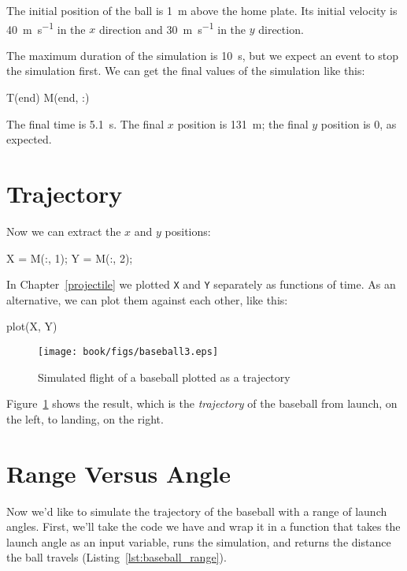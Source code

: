 The initial position of the ball is \SI{1}{\meter} above the home plate.  Its initial velocity is \SI{40}{\meter\per\second} in the $x$ direction and \SI{30}{\meter\per\second} in the $y$ direction.


The maximum duration of the simulation is \SI{10}{\second}, but we expect an event to stop the simulation first.  We can get the final values of the simulation like this:
    
\begin{code}
    T(end)
    M(end, :)
\end{code}

The final time is \SI{5.1}{\second}.  The final $x$ position is \SI{131}{\meter}; the final $y$ position is 0, as expected.


\section{Trajectory}

Now we can extract the $x$ and $y$ positions:

\begin{code}
    X = M(:, 1);
    Y = M(:, 2);
\end{code}

In Chapter~\ref{projectile} we plotted \lstinline{X} and \lstinline{Y} separately as functions of time.  As an alternative, we can plot them against each other, like this:

\begin{code}
    plot(X, Y)
\end{code}

\begin{figure}
\centerline{\texttt{[image: book/figs/baseball3.eps]}}
\caption{Simulated flight of a baseball plotted as a trajectory}
\label{fig:baseball3}
\end{figure}

Figure~\ref{fig:baseball3} shows the result, which is the \emph{trajectory} of the baseball from launch, on the left, to landing, on the right.



\section{Range Versus Angle}

Now we'd like to simulate the trajectory of the baseball with a range of launch angles.  First, we'll take the code we have and wrap it in a function that takes the launch angle as an input variable, runs the simulation, and returns the distance the ball travels (Listing~\ref{lst:baseball_range}).

